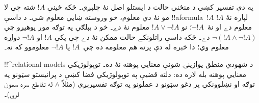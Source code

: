 \documentclass[../../../include/open-logic-section]{subfiles}
\begin{document}
په دې تفسير کښې د منځني حالت د ايستلو اصل نۀ چلېږي۔ ځکه ځينې
$!A$ شته چې لا مو نۀ دي معلوم، خو وروسته ښايي معلوم شي۔ د داسې
!!a{formula}~$!A$ لپاره نۀ $!A$ معلوم دے او نۀ~$\lnot !A$؛
نو $!A \lor \lnot !A$ معلوم نۀ دے۔ خو د بېلګې په توګه موږ
پوهيږو چې $\lnot(!A \land \lnot !A)$ دے۔ ځکه داسې راتلونکے
حالت ممکن نۀ دے چې پکې $!A$ او $\lnot !A$ دواړه معلوم وي؛
دا خبره له دې پرته هم معلومه ده چې~$!A$ يا $\lnot !A$ معلوموو
که نه۔

!!^{relational model}s د شهودي منطق يوازينۍ شونې معنايي پوهنه نۀ ده۔
توپولوژيکي معنايي پوهنه بله لاره ده: دلته قضیې په توپولوژيکي فضا
کښې د پرانيستو سټونو په توګه او نښلوونکي پر دغو سټونو د عملونو په
توګه تفسيرېږي (مثلاً $\land$ له تقاطع سره سمون لري)۔
\end{document}
